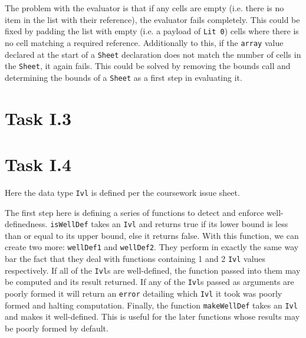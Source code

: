 \documentclass[11pt]{article}
\begin{document}
The problem with the evaluator is that if any cells are empty (i.e. there is no item in the list with their reference), the evaluator fails completely.
This could be fixed by padding the list with empty (i.e. a payload of \verb|Lit 0|) cells where there is no cell matching a required reference.
Additionally to this, if the \verb|array| value declared at the start of a \verb|Sheet| declaration does not match the number of cells in the \verb|Sheet|, it again fails.
This could be solved by removing the bounds call and determining the bounds of a \verb|Sheet| as a first step in evaluating it.

\section{Task I.3}

\section{Task I.4}



Here the data type \verb|Ivl| is defined per the coursework issue sheet.



The first step here is defining a series of functions to detect and enforce well-definedness.
\verb|isWellDef| takes an \verb|Ivl| and returns true if its lower bound is less than or equal to its upper bound, else it returns false.
With this function, we can create two more: \verb|wellDef1| and \verb|wellDef2|.
They perform in exactly the same way bar the fact that they deal with functions containing 1 and 2 \verb|Ivl| values respectively.
If all of the \verb|Ivl|s are well-defined, the function passed into them may be computed and its result returned.
If any of the \verb|Ivl|s passed as arguments are poorly formed it will return an \verb|error| detailing which \verb|Ivl| it took was poorly formed and halting computation.
Finally, the function \verb|makeWellDef| takes an \verb|Ivl| and makes it well-defined.
This is useful for the later functions whose results may be poorly formed by default.


\end{document}
